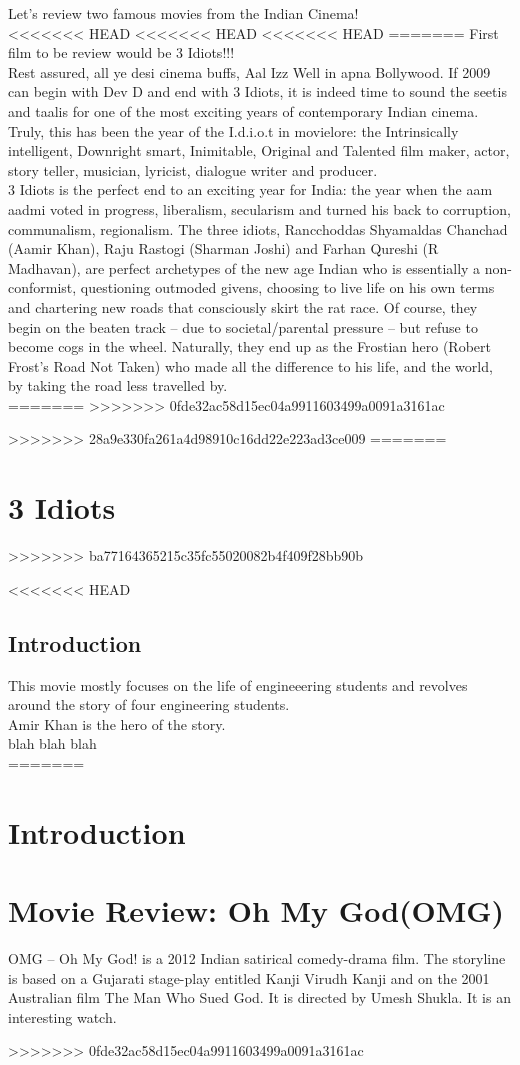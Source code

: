 \documentclass{article}
\begin{document}
Let's review two famous movies from the Indian Cinema!\\
<<<<<<< HEAD
<<<<<<< HEAD
<<<<<<< HEAD
=======
First film to be  review would be 3 Idiots!!! \\
Rest assured, all ye desi cinema buffs, Aal Izz Well in apna Bollywood. If 2009 can begin with Dev D and end with 3 Idiots, it is indeed time to sound the seetis and taalis for one of the most exciting years of contemporary Indian cinema. Truly, this has been the year of the I.d.i.o.t in movielore: the Intrinsically intelligent, Downright smart, Inimitable, Original and Talented film maker, actor, story teller, musician, lyricist, dialogue writer and producer.\\

3 Idiots is the perfect end to an exciting year for India: the year when the aam aadmi voted in progress, liberalism, secularism and turned his back to corruption, communalism, regionalism. The three idiots, Rancchoddas Shyamaldas Chanchad (Aamir Khan), Raju Rastogi (Sharman Joshi) and Farhan Qureshi (R Madhavan), are perfect archetypes of the new age Indian who is essentially a non-conformist, questioning outmoded givens, choosing to live life on his own terms and chartering new roads that consciously skirt the rat race. Of course, they begin on the beaten track -- due to societal/parental pressure -- but refuse to become cogs in the wheel. Naturally, they end up as the Frostian hero (Robert Frost's Road Not Taken) who made all the difference to his life, and the world, by taking the road less travelled by.\\
=======
>>>>>>> 0fde32ac58d15ec04a9911603499a0091a3161ac

>>>>>>> 28a9e330fa261a4d98910c16dd22e223ad3ce009
=======
\section{3 Idiots}
>>>>>>> ba77164365215c35fc55020082b4f409f28bb90b

<<<<<<< HEAD
\subsection{Introduction}
This movie mostly focuses on the life of engineeering students and revolves around the story of four engineering students. \\
Amir Khan is the hero of the story. \\
blah blah blah\\
=======
\section{Introduction}
\section{Movie Review: Oh My God(OMG)}
OMG – Oh My God! is a 2012 Indian satirical comedy-drama film. The storyline is based on a Gujarati stage-play entitled Kanji Virudh Kanji and on the 2001 Australian film The Man Who Sued God. It is directed by Umesh Shukla. It is an interesting watch.

>>>>>>> 0fde32ac58d15ec04a9911603499a0091a3161ac
\end{document}
